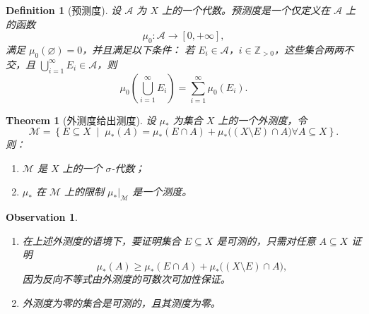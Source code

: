 \documentclass[12pt,letterpaper,twoside,openright]{ctexbook}
\theoremstyle{bluehead}
\newtheorem{theorem}{Theorem}
\theoremstyle{olivehead}
\newtheorem{definition}{Definition}
\theoremstyle{orangehead}
\theoremstyle{redremark}
\newtheorem*{observation}{Observation}
\begin{document}
\begin{definition}[预测度]
设 $\mathcal{A}$ 为 $X$ 上的一个代数。预测度是一个仅定义在 $\mathcal{A}$ 上的函数
\[
  \mu_0\colon\mathcal{A}\longrightarrow[0,+\infty],
\]
满足 $\mu_0(\varnothing)=0$，并且满足以下条件：
若 $E_i\in\mathcal{A}$，$i\in\mathbb{Z}_{>0}$，这些集合两两不交，且 $\bigcup_{i=1}^{\infty}E_i\in\mathcal{A}$，则
\[
  \mu_0\!\left(\bigcup_{i=1}^{\infty}E_i\right)
  =\sum_{i=1}^{\infty}\mu_0(E_i).
\]
\end{definition}
\begin{theorem}[外测度给出测度]\label{thm:outer-measure-construction}
设 $\mu_*$ 为集合 $X$ 上的一个外测度，令
\[
  \mathcal{M}=\left\{E\subseteq X\;\middle|\;
    \mu_*(A)=\mu_*(E\cap A)+\mu_*\bigl((X\setminus E)\cap A\bigr)
    \forall A\subseteq X
  \right\}.
\]
则：
\begin{enumerate}
  \item $\mathcal{M}$ 是 $X$ 上的一个 $\sigma$-代数；
  \item $\mu_*$ 在 $\mathcal{M}$ 上的限制 $\mu_*|_{\mathcal{M}}$ 是一个测度。
\end{enumerate}
\end{theorem}
\begin{observation}
\begin{enumerate}
  \item 在上述外测度的语境下，要证明集合 $E\subseteq X$ 是可测的，只需对任意 $A\subseteq X$ 证明
  \[
    \mu_*(A)\geq\mu_*(E\cap A)+\mu_*\bigl((X\setminus E)\cap A\bigr),
  \]
  因为反向不等式由外测度的可数次可加性保证。
  \item 外测度为零的集合是可测的，且其测度为零。
\end{enumerate}
\end{observation}
\end{document}
